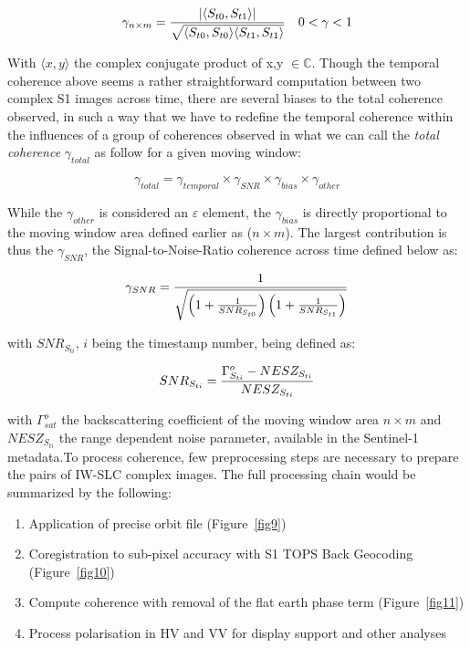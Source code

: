 \documentclass[a4paper,11.5pt,onecolumn]{article}
\begin{document}
\begin{equation}
\gamma_{n \times m} = {|{\langle S_{t0}, S_{t1} \rangle|} \over \sqrt { \langle S_{t0}, S_{t0} \rangle  \langle S_{t1}, S_{t1} \rangle}} \quad 0 < \gamma < 1
\end{equation}

With $\langle x,y \rangle$ the complex conjugate product of x,y $\in \mathbb{C}$. Though the temporal coherence above seems a rather straightforward computation between two complex S1 images across time, there are several biases to the total coherence observed, in such a way that we have to redefine the temporal coherence within the influences of a group of coherences observed in what we can call the \textit{total coherence} $\gamma_{total}$ as follow for a given moving window:

\begin{equation}
\gamma_{total} = \gamma_{temporal} \times \gamma_{SNR} \times \gamma_{bias} \times  \gamma_{other}  
\end{equation}

While the $\gamma_{other}$ is considered an $\varepsilon$ element, the $\gamma_{bias}$ is directly proportional to the moving window area defined earlier as ($n \times m$). The largest contribution is thus the $\gamma_{SNR}$, the Signal-to-Noise-Ratio coherence across time defined below as:
 
\begin{equation}
\gamma_{SNR} = {1 \over {\sqrt{\left ( 1 + {1 \over {SNR_{S_{t0}}}}\right )\left ( 1 + {1 \over {SNR_{S_{t1}}}}\right )}}}  
\end{equation}

with $SNR_{S_{ti}}$, $i$ being the timestamp number, being defined as:

\begin{equation}
SNR_{S_{ti}} = { {\Gamma^o_{S_{ti}} - NESZ_{S_{ti}}} \over NESZ_{S_{ti}} }
\end{equation}

with $\Gamma^o_{sat}$ the backscattering coefficient of the moving window area $n \times m$ and $NESZ_{S_{ti}}$ the range dependent noise parameter, available in the Sentinel-1 metadata.To process coherence, few preprocessing steps are necessary to prepare the pairs of IW-SLC complex images. The full processing chain would be summarized by the following:

\begin{enumerate}
\item Application of precise orbit file (Figure~\ref{fig9})
\item Coregistration to sub-pixel accuracy with S1 TOPS Back Geocoding (Figure~\ref{fig10})
\item Compute coherence with removal of the flat earth phase term  (Figure~\ref{fig11})
\item Process polarisation in HV and VV for display support and other analyses
\end{enumerate}
\end{document}
